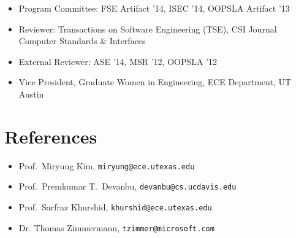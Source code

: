 \documentclass[overlapped,line,letterpaper, 12pt]{res}
\begin{document}
\begin{resume}
\begin{itemize}
\item
Program Committee: {\small FSE  Artifact '14, ISEC '14, OOPSLA Artifact '13}
\item
Reviewer: {\small Transactions on Software Engineering (TSE), CSI Journal Computer Standards \& Interfaces}
\item
External Reviewer: {\small ASE '14,  MSR '12, OOPSLA '12}
\item
{\small Vice President, Graduate Women in Engineering, ECE Department,  UT Austin}
\end{itemize}

\section{\bf References}

\begin{itemize}
\item
Prof.~Miryung Kim,  {\tt miryung@ece.utexas.edu}
\item
Prof.~Premkumar T.~Devanbu, {\tt devanbu@cs.ucdavis.edu}
\item
Prof.~Sarfraz Khurshid, {\tt khurshid@ece.utexas.edu}
\item 
Dr. Thomas Zimmermann, {\tt tzimmer@microsoft.com}

\end{itemize}

%


\end{resume}
\end{document}

